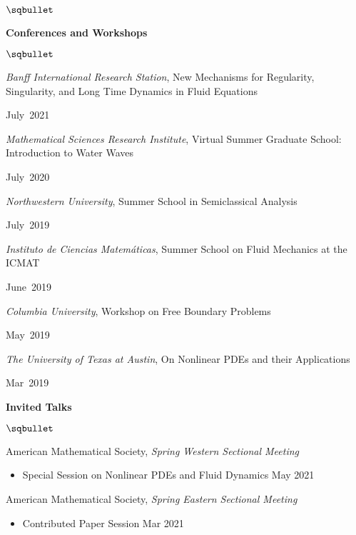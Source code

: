 \documentclass[margin,line]{res}
\newenvironment{list2}{
  \begin{list}{$\sqbullet$}{%
      \setlength{\itemsep}{0.05in}
      \setlength{\parsep}{0in} 
      \setlength{\parskip}{0in}
      \setlength{\topsep}{0.1in} 
      \setlength{\partopsep}{-0.07in} 
      \setlength{\leftmargin}{0.15in}
    }}
{\end{list}}
\begin{document}
\begin{resume}
\begin{list2}
\end{list2}

{\bf Conferences and Workshops}

\begin{list2}

    \item \textit{Banff International Research Station}, New Mechanisms for Regularity, Singularity, and Long Time Dynamics in Fluid Equations
    \strut \hfill July~2021

    \item \textit{Mathematical Sciences Research Institute},
    Virtual Summer Graduate School: Introduction to Water Waves
    \strut \hfill July~2020
    
    \item \textit{Northwestern University},
    Summer School in Semiclassical Analysis
    \strut \hfill July~2019
    
    \item \textit{Instituto de Ciencias Matemáticas},
    Summer School on Fluid Mechanics at the ICMAT
    \strut \hfill June~2019
    
    \item \textit{Columbia University},
    Workshop on Free Boundary Problems 
    \strut \hfill May~2019
    
    \item \textit{The University of Texas at Austin},
    On Nonlinear PDEs and their Applications \\
    \strut \hfill Mar~2019
    
\end{list2}
 
{\bf Invited Talks}

\begin{list2}
        
    \item American Mathematical Society, \textit{Spring Western Sectional Meeting} 
        
        \begin{itemize}
            \item Special Session on Nonlinear PDEs and Fluid Dynamics \hfill May 2021
        \end{itemize}
    
    \item American Mathematical Society, \textit{Spring Eastern Sectional Meeting}
         
        \begin{itemize}
            \item Contributed Paper Session \hfill Mar 2021
        \end{itemize}
    

\end{list2}
\end{resume}
\end{document}
